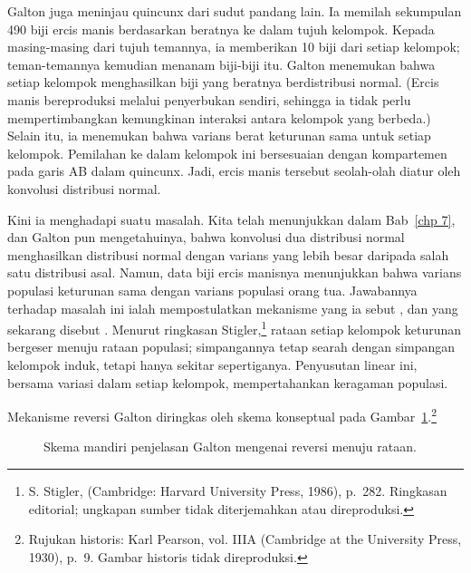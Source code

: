 \par
Galton juga meninjau quincunx dari sudut pandang lain.  Ia memilah sekumpulan 490 biji ercis manis
berdasarkan beratnya ke dalam tujuh kelompok.  Kepada masing-masing dari tujuh temannya, ia
memberikan 10 biji dari setiap kelompok; teman-temannya kemudian menanam biji-biji itu.  Galton
menemukan bahwa setiap kelompok menghasilkan biji yang beratnya berdistribusi normal.  (Ercis
manis bereproduksi melalui penyerbukan sendiri, sehingga ia tidak perlu mempertimbangkan
kemungkinan interaksi antara kelompok yang berbeda.)  Selain itu, ia menemukan bahwa varians berat
keturunan sama untuk setiap kelompok.  Pemilahan ke dalam kelompok ini bersesuaian dengan
kompartemen pada garis AB dalam quincunx.  Jadi, ercis manis tersebut seolah-olah diatur oleh
konvolusi distribusi normal.
\par
Kini ia menghadapi suatu masalah.  Kita telah menunjukkan dalam Bab~\ref{chp 7}, dan Galton pun
mengetahuinya, bahwa konvolusi dua distribusi normal menghasilkan distribusi normal dengan varians
yang lebih besar daripada salah satu distribusi asal.  Namun, data biji ercis manisnya menunjukkan
bahwa varians populasi keturunan sama dengan varians populasi orang tua.  Jawabannya terhadap
masalah ini ialah mempostulatkan mekanisme yang ia sebut , dan yang
sekarang disebut .  Menurut ringkasan
Stigler,\footnote{S. Stigler, 
(Cambridge: Harvard University Press, 1986), p.~282. Ringkasan editorial; ungkapan sumber
tidak diterjemahkan atau direproduksi.} rataan setiap kelompok keturunan bergeser menuju
rataan populasi; simpangannya tetap searah dengan simpangan kelompok induk, tetapi hanya sekitar
sepertiganya. Penyusutan linear ini, bersama variasi dalam setiap kelompok, mempertahankan
keragaman populasi.
\par
Mekanisme reversi Galton diringkas oleh skema konseptual pada
Gambar~\ref{fig 9.63}.\footnote{Rujukan historis: Karl Pearson,  vol. IIIA (Cambridge at the University
Press, 1930), p.~9. Gambar historis tidak direproduksi.}
\begin{figure}[ht]
\centering
{}
\caption{Skema mandiri penjelasan Galton mengenai reversi menuju rataan.}
\label{fig 9.63}
\end{figure}

